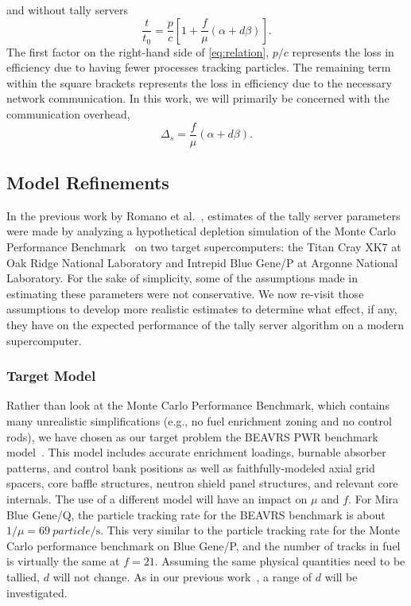 \documentclass{snamc2013}
\begin{document}
and without tally servers
\begin{equation}
  \label{eq:relation}
  \frac{t}{t_0} = \frac{p}{c} \left [ 1 + \frac{f}{\mu} \left ( \alpha + d\beta
  \right ) \right ].
\end{equation}
The first factor on the right-hand side of \autoref{eq:relation}, $p/c$
represents the loss in efficiency due to having fewer processes tracking
particles. The remaining term within the square brackets represents the loss in
efficiency due to the necessary network communication. In this work, we will
primarily be concerned with the communication overhead,
\begin{equation}
  \label{eq:overhead}
  \Delta_s = \frac{f}{\mu} \left ( \alpha + d\beta \right ).
\end{equation}

\subsection{Model Refinements}

In the previous work by Romano et al.~\cite{jcp-romano-2013}, estimates of the
tally server parameters were made by analyzing a hypothetical depletion
simulation of the Monte Carlo Performance Benchmark~\cite{mc-hoogenboom-2011} on
two target supercomputers: the Titan Cray XK7 at Oak Ridge National Laboratory
and Intrepid Blue Gene/P at Argonne National Laboratory. For the sake of
simplicity, some of the assumptions made in estimating these parameters were not
conservative. We now re-visit those assumptions to develop more realistic
estimates to determine what effect, if any, they have on the expected
performance of the tally server algorithm on a modern supercomputer.

\subsubsection{Target Model}

Rather than look at the Monte Carlo Performance Benchmark, which contains many
unrealistic simplifications (e.g., no fuel enrichment zoning and no control
rods), we have chosen as our target problem the BEAVRS PWR benchmark
model~\cite{mc-horelik-2013}. This model includes accurate enrichment loadings,
burnable absorber patterns, and control bank positions as well as
faithfully-modeled axial grid spacers, core baffle structures, neutron shield
panel structures, and relevant core internals. The use of a different model will
have an impact on $\mu$ and $f$. For Mira Blue Gene/Q, the particle tracking
rate for the BEAVRS benchmark is about $1/\mu = \SI{69}{particle/\second}$. This
very similar to the particle tracking rate for the Monte Carlo performance
benchmark on Blue Gene/P, and the number of tracks in fuel is virtually the same
at $f = 21$. Assuming the same physical quantities need to be tallied, $d$ will
not change. As in our previous work~\cite{jcp-romano-2013}, a range of $d$ will
be investigated.
\end{document}
